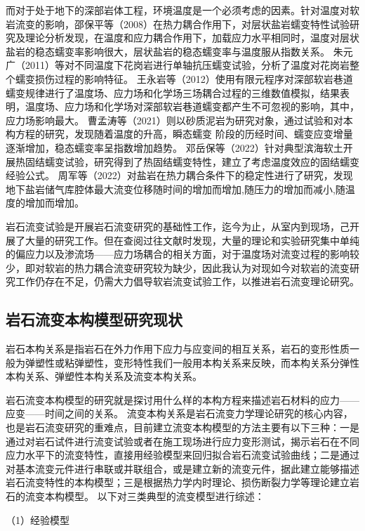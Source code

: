 而对于处于地下的深部岩体工程，环境温度是一个必须考虑的因素。针对温度对软岩流变的影响，邵保平等（2008）在热力耦合作用下，对层状盐岩蠕变特性试验研究及理论分析发现，在温度和应力耦合作用下，加载应力水平相同时，温度对层状盐岩的稳态蠕变率影响很大，层状盐岩的稳态蠕变率与温度服从指数关系\cite{邵保平2008}。
朱元广（2011）等对不同温度下花岗岩进行单轴抗压蠕变试验，分析了温度对花岗岩整个蠕变损伤过程的影响特征\cite{朱元广2011}。
王永岩等（2012）使用有限元程序对深部软岩巷道蠕变规律进行了温度场、应力场和化学场三场耦合过程的三维数值模拟，结果表明，温度场、应力场和化学场对深部软岩巷道蠕变都产生不可忽视的影响，其中，应力场影响最大\cite{王永岩2012}。
曹孟涛等（2021）则以砂质泥岩为研究对象，通过试验和对本构方程的研究，发现随着温度的升高，瞬态蠕变
阶段的历经时间、蠕变应变增量逐渐增加，稳态蠕变率呈指数增加趋势\cite{曹孟涛2021}。
邓岳保等（2022）针对典型滨海软土开展热固结蠕变试验，研究得到了热固结蠕变特性，建立了考虑温度效应的固结蠕变经验公式\cite{邓岳保2022}。
周军等（2022）对盐岩在热力耦合条件下的稳定性进行了研究，发现地下盐岩储气库腔体最大流变位移随时间的增加而增加,随压力的增加而减小,随温度的增加而增加\cite{周军2022}。

岩石流变试验是开展岩石流变研究的基础性工作，迄今为止，从室内到现场，己开展了大量的研究工作。但在查阅过往文献时发现，大量的理论和实验研究集中单纯的偏应力以及渗流场——应力场耦合的相关方面，对于温度场对流变过程的影响较少，即对软岩的热力耦合流变研究较为缺少，因此我认为对现如今对软岩的流变研究工作仍存在不足，仍需大力倡导软岩流变试验工作，以推进岩石流变理论研究。

\subsection{岩石流变本构模型研究现状}
岩石本构关系是指岩石在外力作用下应力与应变间的相互关系，岩石的变形性质一般为弹塑性或粘弹塑性，变形特性我们一般用本构关系来反映，而本构关系分弹性本构关系、弹塑性本构关系及流变本构关系。

岩石流变本构模型的研究就是探讨用什么样的本构方程来描述岩石材料的应力——应变——时间之间的关系。
流变本构关系是岩石流变力学理论研究的核心内容，也是岩石流变研究的重难点，目前建立流变本构模型的方法主要有以下三种：一是通过对岩石试件进行流变试验或者在施工现场进行应力变形测试，揭示岩石在不同应力水平下的流变特性，直接用经验模型来回归拟合岩石流变试验曲线；二是通过对基本流变元件进行串联或并联组合，或是建立新的流变元件，据此建立能够描述岩石流变特性的本构模型；三是根据热力学内时理论、损伤断裂力学等理论建立岩石的流变本构模型。
以下对三类典型的流变模型进行综述：

（1）经验模型

